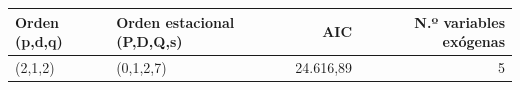 \begin{tabular}{llrr}
\toprule
\rowcolor{naranja}
\textbf{Orden (p,d,q)} & \textbf{Orden estacional (P,D,Q,s)} & \textbf{AIC} & \textbf{N.º variables exógenas} \\
\midrule
\rowcolor{filaclara} (2,1,2) & (0,1,2,7) & 24.616,89 & 5 \\
\bottomrule
\end{tabular}
